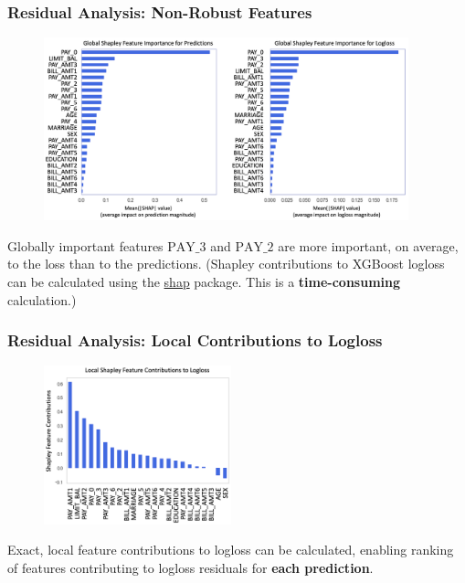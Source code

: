 \documentclass[11pt,
               aspectratio=169,
               hyperref={colorlinks}
               ]{beamer}
\begin{document}
			\begin{frame}[t]
		
				\frametitle{\large{\textbf{Residual Analysis}: Non-Robust Features}}
				\vspace{-10pt}
				\begin{figure}
					\begin{center}
						\includegraphics[height=150pt]{../img/global_pred_loss.png}
					\end{center}
				\end{figure}
				\vspace{-8pt}	
				\scriptsize{Globally important features $\text{PAY\_3}$ and $\text{PAY\_2}$ are more important, on average, to the loss than to the predictions. (Shapley contributions to XGBoost logloss can be calculated using the \href{https://github.com/slundberg/shap}{shap} package. This is a \textbf{time-consuming} calculation.)} 
		
			\end{frame}

			\begin{frame}
		
				\frametitle{\textbf{Residual Analysis}: Local Contributions to Logloss}
		
				\begin{figure}
					\begin{center}
						\includegraphics[height=130pt]{../img/local.png}
					\end{center}
				\end{figure}	
				Exact, local feature contributions to logloss can be calculated, enabling ranking of features contributing to logloss residuals for \textbf{each prediction}.
			\end{frame}
\end{document}
